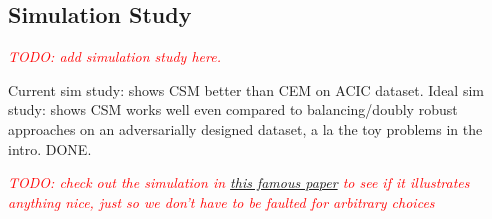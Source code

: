 \documentclass{article}
\newcommand{\note}[1]{\textcolor{red}{\textit{#1}}}
\begin{document}


\subsection{Simulation Study}

\note{TODO: add simulation study here.}

Current sim study: shows CSM better than CEM on ACIC dataset.
Ideal sim study: shows CSM works well even compared to balancing/doubly robust approaches on an adversarially designed dataset, a la the toy problems in the intro. DONE.

\note{TODO: check out the simulation in \href{https://arxiv.org/pdf/0804.2958.pdf}{this famous paper} to see if it illustrates anything nice, just so we don't have to be faulted for arbitrary choices}


\end{document}
